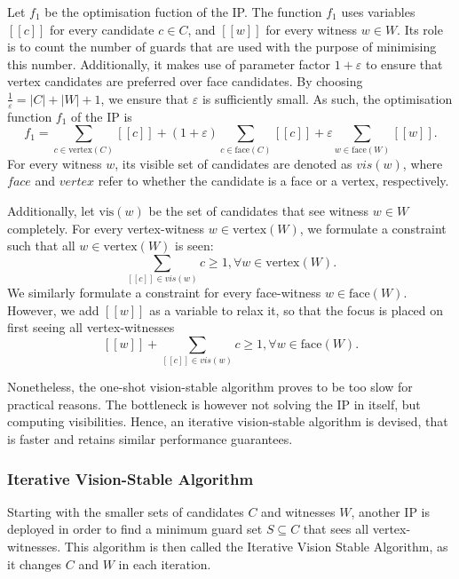 Let $f_1$ be the optimisation fuction of the IP. The function $f_1$ uses variables $[[c]]$ for every candidate $c \in C$, and $[[w]]$ for every witness $w \in W$. Its role is to count the number of guards that are used with the purpose of minimising this number. Additionally, it makes use of parameter factor $1 + \varepsilon$  to ensure that vertex candidates are preferred over face candidates. By choosing $\frac 1 \varepsilon = |C| + |W| + 1$, we ensure that $\varepsilon$ is sufficiently small. As such, the optimisation function $f_1$ of the IP is 
$$f_1 = \sum_{c \in \text{vertex}(C)} [[c]] + (1 + \varepsilon)\sum_{c \in \text{face}(C)} [[c]] + \varepsilon \sum_{w \in \text{face}(W)} [[w]].$$
For every witness $w$, its visible set of candidates are denoted as $vis(w)$, where $face$ and $vertex$ refer to whether the candidate is a face or a vertex, respectively.

Additionally, let $\text{vis}(w)$ be the set of candidates that see witness $w \in W$ completely. For every vertex-witness $w \in \text{vertex}(W)$, we formulate a constraint such that all $w \in \text{vertex}(W)$ is seen: $$\sum_{[[c]] \in vis(w)} c \geq 1, \forall w \in \text{vertex}(W).$$ We similarly formulate a constraint for every face-witness $w \in \text{face}(W)$. However, we add $[[w]]$ as a variable to relax it, so that the focus is placed on first seeing all vertex-witnesses $$[[w]] + \sum_{[[c]] \in vis(w)} c \geq 1, \forall w \in \text{face}(W).$$


Nonetheless, the one-shot vision-stable algorithm proves to be too slow for practical reasons. The bottleneck is however not solving the IP in itself, but computing visibilities. Hence, an iterative vision-stable algorithm is devised, that is faster and retains similar performance guarantees. 

\subsubsection{Iterative Vision-Stable Algorithm}
Starting with the smaller sets of candidates $C$ and witnesses $W$, another IP is deployed in order to find a minimum guard set $S \subseteq C$ that sees all vertex-witnesses. This algorithm is then called the Iterative Vision Stable Algorithm, as it changes $C$ and $W$ in each iteration.

